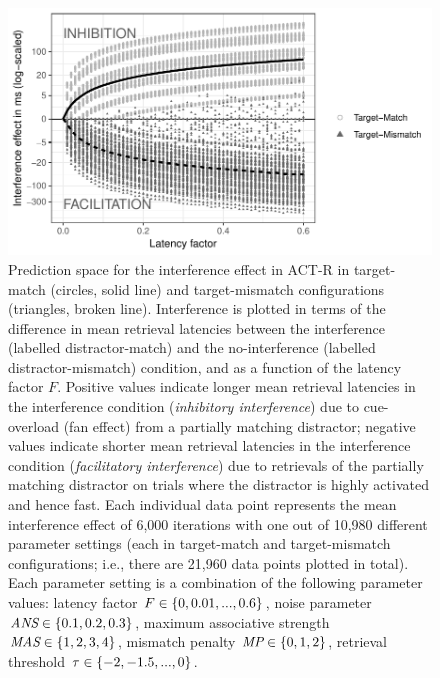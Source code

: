 \documentclass{cambridge7A}\usepackage[]{graphicx}\usepackage[]{color}
\begin{document}
\begin{figure}[htbp]
\centering
\includegraphics[width=.8\textwidth]{figures/fig-lv05plots1} 
\caption{Prediction space for the interference effect in ACT-R in target-match (circles, solid line) and target-mismatch configurations (triangles, broken line). Interference is plotted in terms of the difference in mean retrieval latencies between the interference (labelled distractor-match) and the no-interference (labelled distractor-mismatch) condition, and as a function of the latency factor $F$. Positive values indicate longer mean retrieval latencies in the interference condition (\emph{inhibitory interference}) due to cue-overload (fan effect) from a partially matching distractor; negative values indicate shorter mean retrieval latencies in the interference condition (\emph{facilitatory interference}) due to retrievals of the partially matching distractor on trials where the distractor is highly activated and hence fast. Each individual data point represents the mean interference effect of 6,000 iterations with one out of 10,980 different parameter settings (each in target-match and target-mismatch configurations; i.e., there are 21,960 data points plotted in total). Each parameter setting is a combination of the following parameter values: latency factor $\protect F \in \{0, 0.01, ..., 0.6\}$, noise parameter $\protect \textit{ANS} \in \{0.1, 0.2, 0.3\}$, maximum associative strength $\protect \textit{MAS} \in \{1,2,3,4\}$, mismatch penalty $\protect \textit{MP} \in \{0,1,2\}$, retrieval threshold $\protect \tau \in \{-2,-1.5,...,0\}$.}\label{fig:lv05plots}
\end{figure}
\end{document}

